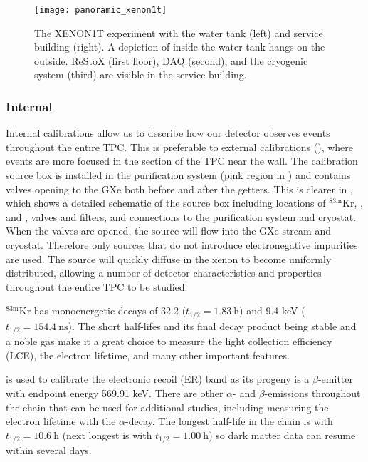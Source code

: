 \begin{figure}
\centering
\texttt{[image: panoramic\_xenon1t]}
\caption{The XENON1T experiment with the water tank (left) and service building (right).  A depiction of inside the water tank
hangs on the outside.  ReStoX (first floor), DAQ (second), and the cryogenic system (third) are visible in the service building.}
\label{fig:xenon1t_panoramic}
\end{figure}

\subsubsection{Internal}
\label{subsubsec:xenon1t_calibrations_internal}
Internal calibrations allow us to describe how our detector observes events throughout the entire TPC.  This is preferable to external
calibrations (), where events are more focused in the section of the TPC near the
wall.  The calibration source box is installed in the
purification system (pink region in
) and contains valves opening to the GXe both before and after the
getters.  This is clearer in , which shows a detailed schematic of the source box including
locations of $\mathrm{^{83m}Kr}$, , and , valves and filters, and connections to the purification system and
cryostat.  When the valves are opened,
the source will flow into the GXe stream and cryostat.  Therefore only sources that do not introduce
electronegative impurities are used.  The source will quickly diffuse in the xenon to become uniformly distributed,
allowing a number of detector characteristics and properties throughout the entire TPC to be studied.

$\mathrm{^{83m}Kr}$ has monoenergetic decays of 32.2 ($t_{1/2} = 1.83\ \mathrm{h}$) and 9.4 keV
($t_{1/2} = 154.4\ \mathrm{ns}$).  The short
half-lifes and its final decay product  being stable and a noble gas make it a great choice to measure the light collection
efficiency (LCE), the electron lifetime, and many other important features.

\radoncal is used to calibrate the electronic recoil (ER) band as its progeny  is a $\beta$-emitter with endpoint energy
569.91 keV.  There are other $\alpha$- and $\beta$-emissions throughout the chain that can be used for additional studies,
including measuring the electron lifetime with the  $\alpha$-decay.  The longest half-life in the chain is
 with $t_{1/2} = 10.6\ \mathrm{h}$ (next longest is  with $t_{1/2} = 1.00\ \mathrm{h}$) so dark matter data
can resume within several days.

